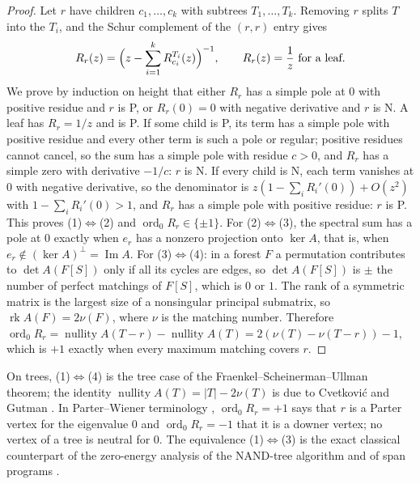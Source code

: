 \documentclass[11pt]{amsart}
\theoremstyle{plain}
\theoremstyle{definition}
\theoremstyle{remark}
\numberwithin{equation}{section}
\newcommand{\ord}{\operatorname{ord}}
\newcommand{\rk}{\operatorname{rk}}
\begin{document}
\begin{proof}
Let $r$ have children $c_1,\dots,c_k$ with subtrees $T_1,\dots,T_k$. Removing $r$ splits $T$ into the $T_i$, and the Schur complement of the $(r,r)$ entry gives
\begin{equation}\label{eq:schur}
R_r(z)=\Bigl(z-\sum_{i=1}^kR^{T_i}_{c_i}(z)\Bigr)^{-1},\qquad R_r(z)=\frac1z\ \text{for a leaf.}
\end{equation}
We prove by induction on height that either $R_r$ has a simple pole at $0$ with positive residue and $r$ is P, or $R_r(0)=0$ with negative derivative and $r$ is N. A leaf has $R_r=1/z$ and is P. If some child is P, its term has a simple pole with positive residue and every other term is such a pole or regular; positive residues cannot cancel, so the sum has a simple pole with residue $c>0$, and $R_r$ has a simple zero with derivative $-1/c$: $r$ is N. If every child is N, each term vanishes at $0$ with negative derivative, so the denominator is $z(1-\sum_iR_i'(0))+O(z^2)$ with $1-\sum_iR_i'(0)>1$, and $R_r$ has a simple pole with positive residue: $r$ is P. This proves (1)$\Leftrightarrow$(2) and $\ord_0R_r\in\{\pm1\}$.
For (2)$\Leftrightarrow$(3), the spectral sum has a pole at $0$ exactly when $e_r$ has a nonzero projection onto $\ker A$, that is, when $e_r\notin(\ker A)^{\perp}=\operatorname{Im}A$. For (3)$\Leftrightarrow$(4): in a forest $F$ a permutation contributes to $\det A(F[S])$ only if all its cycles are edges, so $\det A(F[S])$ is $\pm$ the number of perfect matchings of $F[S]$, which is $0$ or $1$. The rank of a symmetric matrix is the largest size of a nonsingular principal submatrix, so $\rk A(F)=2\nu(F)$, where $\nu$ is the matching number. Therefore $\ord_0R_r=\operatorname{nullity}A(T-r)-\operatorname{nullity}A(T)=2(\nu(T)-\nu(T-r))-1$, which is $+1$ exactly when every maximum matching covers $r$.
\end{proof}

On trees, (1)$\Leftrightarrow$(4) is the tree case of the Fraenkel--Scheinerman--Ullman theorem; the identity $\operatorname{nullity}A(T)=|T|-2\nu(T)$ is due to Cvetkovi\'c and Gutman \cite{CvetkovicGutman}. In Parter--Wiener terminology \cite{JLS}, $\ord_0R_r=+1$ says that $r$ is a Parter vertex for the eigenvalue $0$ and $\ord_0R_r=-1$ that it is a downer vertex; no vertex of a tree is neutral for $0$. The equivalence (1)$\Leftrightarrow$(3) is the exact classical counterpart of the zero-energy analysis of the NAND-tree algorithm \cite{FGG} and of span programs \cite{ReichardtSpalek}.
\end{document}
